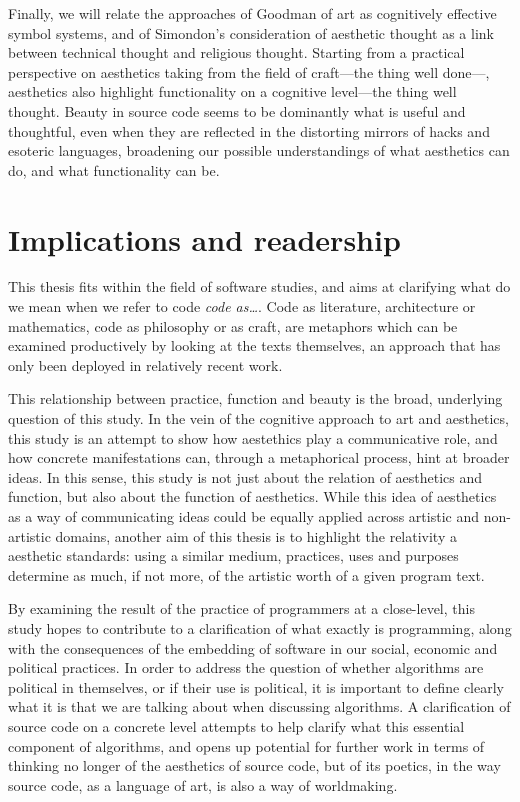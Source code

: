 Finally, we will relate the approaches of Goodman of art as cognitively effective symbol systems, and of Simondon's consideration of aesthetic thought as a link between technical thought and religious thought. Starting from a practical perspective on aesthetics taking from the field of craft—the thing well done—, aesthetics also highlight functionality on a cognitive level—the thing well thought. Beauty in source code seems to be dominantly what is useful and thoughtful, even when they are reflected in the distorting mirrors of hacks and esoteric languages, broadening our possible understandings of what aesthetics can do, and what functionality can be.

\section{Implications and readership}

This thesis fits within the field of software studies, and aims at clarifying what do we mean when we refer to code \emph{code as\dots}. Code as literature, architecture or mathematics, code as philosophy or as craft, are metaphors which can be examined productively by looking at the texts themselves, an approach that has only been deployed in relatively recent work.

This relationship between practice, function and beauty is the broad, underlying question of this study. In the vein of the cognitive approach to art and aesthetics, this study is an attempt to show how aestethics play a communicative role, and how concrete manifestations can, through a metaphorical process, hint at broader ideas. In this sense, this study is not just about the relation of aesthetics and function, but also about the function of aesthetics. While this idea of aesthetics as a way of communicating ideas could be equally applied across artistic and non-artistic domains, another aim of this thesis is to highlight the relativity a aesthetic standards: using a similar medium, practices, uses and purposes determine as much, if not more, of the artistic worth of a given program text.

By examining the result of the practice of programmers at a close-level, this study hopes to contribute to a clarification of what exactly is programming, along with the consequences of the embedding of software in our social, economic and political practices. In order to address the question of whether algorithms are political in themselves, or if their use is political, it is important to define clearly what it is that we are talking about when discussing algorithms. A clarification of source code on a concrete level attempts to help clarify what this essential component of algorithms, and opens up potential for further work in terms of thinking no longer of the aesthetics of source code, but of its poetics, in the way source code, as a language of art, is also a way of worldmaking.

